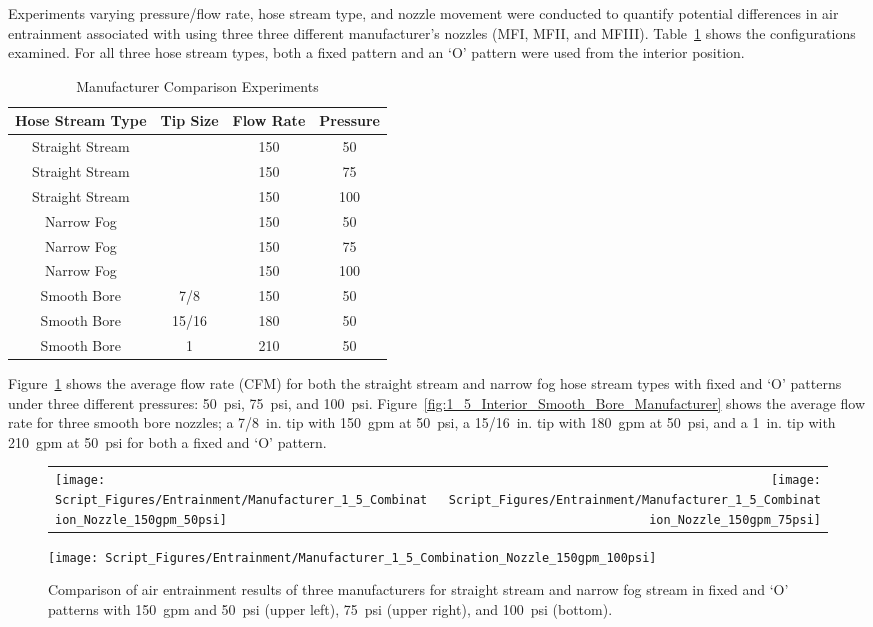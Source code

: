 \documentclass[12pt,oneside]{book}
\begin{document}
Experiments varying pressure/flow rate, hose stream type, and nozzle movement were conducted to quantify potential differences in air entrainment associated with using three three different manufacturer's nozzles (MFI, MFII, and MFIII). Table~\ref{tab:Manufacturer_Comparison_Experiments} shows the configurations examined. For all three hose stream types, both a fixed pattern and an `O' pattern were used from the interior position.

\begin{table}[!ht]
\centering
\caption{Manufacturer Comparison Experiments}
\label{tab:Manufacturer_Comparison_Experiments}
\begin{tabular}{cccc}
\toprule[1.5pt]
Hose Stream Type & Tip Size & Flow Rate & Pressure \\ 
\midrule
Straight Stream &       & 150 & 50 \\
Straight Stream &       & 150 & 75 \\
Straight Stream &       & 150 & 100 \\
Narrow Fog      &       & 150 & 50 \\
Narrow Fog      &       & 150 & 75 \\
Narrow Fog      &       & 150 & 100 \\
Smooth Bore     & 7/8   & 150 & 50 \\
Smooth Bore     & 15/16 & 180 & 50 \\
Smooth Bore     & 1     & 210 & 50 \\
\bottomrule[1.25pt]
\end{tabular}
\end{table}

Figure~\ref{fig:1_5_Interior_Combination_Manufacturer} shows the average flow rate (CFM) for both the straight stream and narrow fog hose stream types with fixed and `O' patterns under three different pressures: 50~psi, 75~psi, and 100~psi. Figure~\ref{fig:1_5_Interior_Smooth_Bore_Manufacturer} shows the average flow rate for three smooth bore nozzles; a 7/8~in. tip with 150~gpm at 50~psi, a 15/16~in. tip with 180~gpm at 50~psi, and a 1~in. tip with 210~gpm at 50~psi for both a fixed and `O' pattern.

\begin{figure}[!ht]
\begin{tabular*}{\textwidth}{lr}
\texttt{[image: Script\_Figures/Entrainment/Manufacturer\_1\_5\_Combination\_Nozzle\_150gpm\_50psi]} &
\texttt{[image: Script\_Figures/Entrainment/Manufacturer\_1\_5\_Combination\_Nozzle\_150gpm\_75psi]} \\
\end{tabular*}
\centering
\texttt{[image: Script\_Figures/Entrainment/Manufacturer\_1\_5\_Combination\_Nozzle\_150gpm\_100psi]}
\caption[Average Air Entrainment Varying Manufacturer with Combination Nozzles]{Comparison of air entrainment results of three manufacturers for straight stream and narrow fog stream in fixed and `O' patterns with 150~gpm and 50~psi (upper left), 75~psi (upper right), and 100~psi (bottom).}
\label{fig:1_5_Interior_Combination_Manufacturer}
\end{figure}
\end{document}
